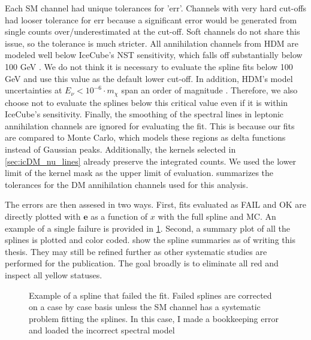 Each SM channel had unique tolerances for 'err'.
Channels with very hard cut-offs had looser tolerance for err because a significant error would be generated from single counts over/underestimated at the cut-off.
Soft channels do not share this issue, so the tolerance is much stricter.
All annihilation channels from HDM are modeled well below IceCube's NST sensitivity, which falls off substantially below 100 GeV \cite{IC3_thesis_Cerver}.
We do not think it is necessary to evaluate the spline fits below 100 GeV and use this value as the default lower cut-off.
In addition, HDM's model uncertainties at $E_\nu < 10^{-6}\cdot m_\chi$ span an order of magnitude \cite{Rodd:HDM_spec}.
Therefore, we also choose not to evaluate the splines below this critical value even if it is within IceCube's sensitivity.
Finally, the smoothing of the spectral lines in leptonic annihilation channels are ignored for evaluating the fit.
This is because our fits are compared to Monte Carlo, which models these regions as delta functions instead of Gaussian peaks.
Additionally, the kernels selected in \cref{sec:icDM_nu_lines} already preserve the integrated counts.
We used the lower limit of the kernel mask as the upper limit of evaluation.
 summarizes the tolerances for the DM annihilation channels used for this analysis.


The errors are then assesed in two ways.
First, fits evaluated as FAIL and OK are directly plotted with $\textbf{e}$ as a function of $x$ with the full spline and MC.
An example of a single failure is provided in \cref{fig:icDM_failedspline}.
Second, a summary plot of all the splines is plotted and color coded.
 show the spline summaries as of writing this thesis.
They may still be refined further as other systematic studies are performed for the publication.
The goal broadly is to eliminate all red and inspect all yellow statuses.

\begin{figure}
    \caption{Example of a spline that failed the fit. Failed splines are corrected on a case by case basis unless the SM channel has a systematic problem fitting the splines. In this case, I made a bookkeeping error and loaded the incorrect spectral model}
    \label{fig:icDM_failedspline}
\end{figure}

